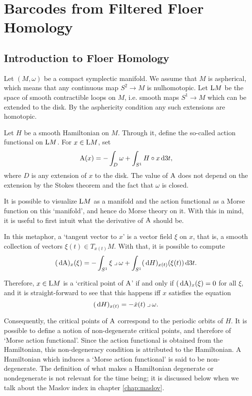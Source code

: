 \chapter{Barcodes from Filtered Floer Homology}\label{chap:bffh}

\section{Introduction to Floer Homology}

Let $(M, \omega)$ be a compact symplectic manifold. We assume that $M$ is aspherical, which means that any continuous map $S^2 \to M$ is nulhomotopic. Let $\LL M$ be the space of smooth contractible loops on $M$, i.e. smooth maps $S^1 \to M$ which can be extended to the disk. By the asphericity condition any such extensions are homotopic.

Let $H$ be a smooth Hamiltonian on $M$. Through it, define the so-called action functional on $\LL M$. For $x \in \LL M$, set
\begin{equation}\label{eq:defaction}
\AA(x) = - \int_D \omega + \int_{S^1} H \circ x \dl3 t,
\end{equation}
where $D$ is any extension of $x$ to the disk. The value of $\AA$ does not depend on the extension by the Stokes theorem and the fact that $\omega$ is closed.

It is possible to visualize $\LL M$ as a manifold and the action functional as a Morse function on this `manifold', and hence do Morse theory on it. With this in mind, it is useful to first intuit what the derivative of $\AA$ should be.

In this metaphor, a `tangent vector to $x$' is a vector field $\xi$ on $x$, that is, a smooth collection of vectors $\xi(t) \in T_{x(t)} M$. With that, it is possible to compute
\begin{equation}
 (\dl \AA)_x(\xi) = - \int_{S^1} \xi \into \omega + \int_{S^1} (\dl H)_{x(t)} (\xi(t)) \dl3t. 
\end{equation}

Therefore, $x\in \LL M$ is a `critical point of $\AA$' if and only if $(\dl \AA)_x(\xi) = 0$ for all $\xi$, and it is straight-forward to see that this happens iff $x$ satisfies the equation
\begin{equation}
(\dl H)_{x(t)} = - \dot x(t) \into \omega.
\end{equation}

Consequently, the critical points of $\AA$ correspond to the periodic orbits of $H$. It is possible to define a notion of non-degenerate critical points, and therefore of `Morse action functional'. Since the action functional is obtained from the Hamiltonian, this non-degeneracy condition is attributed to the Hamiltonian. A Hamiltonian which induces a `Morse action functional' is said to be non-degenerate. The definition of what makes a Hamiltonian degenerate or nondegenerate is not relevant for the time being; it is discussed below when we talk about the Maslov index in chapter \ref{chap:maslov}.

